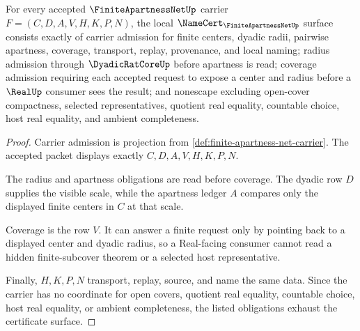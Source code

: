 \begin{theorem}
\label{thm:finite-apartness-net-namecert-obligations}
For every accepted $\FiniteApartnessNetUp$ carrier $F=(C,D,A,V,H,K,P,N)$, the local $\NameCert_{\FiniteApartnessNetUp}$ surface consists exactly of carrier admission for finite centers, dyadic radii, pairwise apartness, coverage, transport, replay, provenance, and local naming; radius admission through $\DyadicRatCoreUp$ before apartness is read; coverage admission requiring each accepted request to expose a center and radius before a $\RealUp$ consumer sees the result; and nonescape excluding open-cover compactness, selected representatives, quotient real equality, countable choice, host real equality, and ambient completeness.
\end{theorem}
\begin{proof}
Carrier admission is projection from \autoref{def:finite-apartness-net-carrier}. The accepted packet displays exactly $C,D,A,V,H,K,P,N$.

The radius and apartness obligations are read before coverage. The dyadic row $D$ supplies the visible scale, while the apartness ledger $A$ compares only the displayed finite centers in $C$ at that scale.

Coverage is the row $V$. It can answer a finite request only by pointing back to a displayed center and dyadic radius, so a Real-facing consumer cannot read a hidden finite-subcover theorem or a selected host representative.

Finally, $H,K,P,N$ transport, replay, source, and name the same data. Since the carrier has no coordinate for open covers, quotient real equality, countable choice, host real equality, or ambient completeness, the listed obligations exhaust the certificate surface.
\end{proof}

